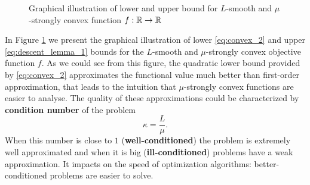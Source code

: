 \begin{figure}[H]
\centering

\caption{Graphical illustration of lower and upper bound for $L$-smooth and $\mu$-strongly convex function $f:\mathbb{R}\rightarrow \mathbb{R}$}
\label{fig:functional_approximations}
\end{figure}

In Figure \ref{fig:functional_approximations} we present the graphical illustration of lower \eqref{eq:convex_2} and upper \eqref{eq:descent_lemma_1} bounds for the $L$-smooth and $\mu$-strongly convex objective function $f$. {\color{red}As we could see from this figure, the quadratic lower bound provided by \eqref{eq:convex_2} approximates the functional value much better than first-order approximation, that leads to the intuition that $\mu$-strongly convex functions are easier to analyse.} The quality of these approximations could be characterized by {\textbf{condition number}} of the problem
$$
\kappa =  \frac{L}{\mu}.
$$
When this number is close to $1$ ({\textbf{well-conditioned}}) the problem is extremely well approximated and when it is big ({\textbf{ill-conditioned}}) problems have a weak approximation. It impacts on the speed of optimization algorithms: better-conditioned problems are easier to solve.

